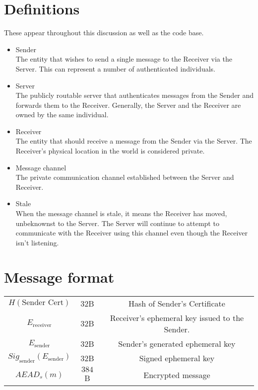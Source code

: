 \documentclass[11pt]{article}
\begin{document}
\pagebreak
\section*{Definitions}
These appear throughout this discussion as well as the code base.
\begin{itemize}
\item Sender \\
The entity that wishes to send a single message to the Receiver via the Server.
This can represent a number of authenticated individuals.
\item Server \\
The publicly routable server that authenticates messages from the Sender and
forwards them to the Receiver. Generally, the Server and the Receiver are
owned by the same individual.
\item Receiver \\
The entity that should receive a message from the Sender via the Server. The
Receiver's physical location in the world is considered private.
\item Message channel \\
The private communication channel established between the Server and Receiver.
\item Stale \\
When the message channel is stale, it means the Receiver has moved, unbeknownst
to the Server. The Server will continue to attempt to communicate with the
Receiver using this channel even though the Receiver isn't listening.
\end{itemize}
\pagebreak

\section*{Message format}
\begin{tabular}{c c c}
  $H(\text{Sender Cert})$ & $32$B &
    Hash of Sender's Certificate \\
  $E_{\text{receiver}}$ & $32$B &
    Receiver's ephemeral key issued to the Sender. \\
  $E_{\text{sender}}$ & $32$B &
    Sender's generated ephemeral key \\
  $Sig_{\text{sender}}\left(E_{\text{sender}}\right)$ & $32$B &
    Signed ephemeral key \\
  $AEAD_{s}\left(m\right)$ & $384$B &
    Encrypted message \\
\end{tabular}
\end{document}

